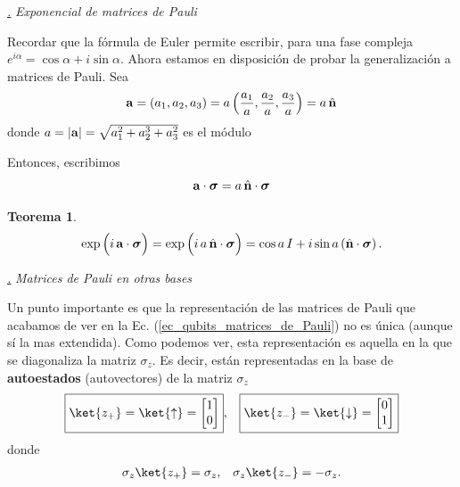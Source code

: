 \documentclass[a4paper,11pt]{book} %
\newtheorem{teorema_contador}{Teorema}
\newcommand{\Teorema}[1]{
		\begin{mybox_gray2}{}
			\begin{teorema_contador}
				 #1 
			\end{teorema_contador} 
		\end{mybox_gray2}
	}
\numberwithin{equation}{chapter}
\def\subsubiContadorIt{\par\addtocounter{subsubsection}{1}\underline{\it\thesubsubsection.}\hskip0.5cm \setcounter{subsubsubsectionIt}{0}}
\newcommand{\SubsubiIt}[1]{
		\subsubiContadorIt \textit{#1}
	}
\newcounter{subsubsubsectionIt}[subsubsection]
\begin{document}
			\SubsubiIt{Exponencial de matrices de Pauli}

Recordar que la fórmula de Euler permite escribir, para una fase compleja $ e^{i\alpha} = \cos\alpha + i \sin\alpha $. Ahora estamos en disposición de probar la generalización a matrices de Pauli.  Sea 
$$
{\bf a} = (a_1,a_2,a_3) =a \left( \frac{a_1}{a},\frac{a_2}{a},\frac{a_3}{a}\right) =  a\, \hat{\bf n}
$$ 
donde $a=|{\bf a}|=\sqrt{a_1^2+a_2^3+a_3^2}$ es el módulo

Entonces, escribimos
$$
 {\bf a} \cdot \boldsymbol{\sigma} =  a\, \hat{\bf n} \cdot \boldsymbol{\sigma}
$$

	\Teorema{
		\begin{equation}
		\exp \left( \rule{0mm}{4mm} i\,   {\bf a} \cdot \boldsymbol{\sigma}  \right) = \exp \left( \rule{0mm}{4mm} i\,   a\, \hat{\bf n} \cdot \boldsymbol{\sigma}  \right) = \cos a \, I + i \sin a \,(\hat{\bf n} \cdot  \boldsymbol{\sigma}) \, .
		\end{equation}
	}

			\SubsubiIt{Matrices de Pauli en otras bases}

Un punto importante es que la representación de las matrices de Pauli que acabamos de ver en la Ec. (\ref{ec_qubits_matrices_de_Pauli}) no es única (aunque sí la mas extendida). Como podemos ver, esta representación es aquella en la que se diagonaliza la matriz $\sigma_z$. Es decir, están representadas en la base de \textbf{autoestados} (autovectores) de la matriz $\sigma_z$
\begin{align*}
& \boxed{\ket{z_+} = \ket{\uparrow} = \begin{bmatrix}  1 \\ 0  \end{bmatrix}},
& \boxed{\ket{z_-} = \ket{\downarrow} = \begin{bmatrix}  0 \\ 1  \end{bmatrix}}
\end{align*}
donde
\begin{align*}
& \sigma_z \ket{z_+} =   \sigma_z, 
& \sigma_z \ket{z_-} = - \sigma_z.
\end{align*}
\end{document}
